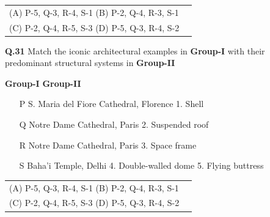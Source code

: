 \documentclass[journal,12pt,onecolumn]{IEEEtran}
\theoremstyle{remark}
\begin{document}
 \bigskip
 
\begin{tabular}{ll}
\hspace{2cm}(A)  P-5, Q-3, R-4, S-1
\hspace{4cm}(B)  P-2, Q-4, R-3, S-1 \\  \vspace{0.5cm}
\hspace{2cm}(C)  P-2, Q-4, R-5, S-3 
\hspace{4cm}(D)  P-5, Q-3, R-4, S-2 
\end{tabular}


\vspace{0.5cm}

\textbf{Q.31} Match the iconic architectural examples in \textbf{Group-I} with their predominant structural systems in \textbf{Group-II}

\vspace{0.15cm}

\hspace{3cm}  \textbf{Group-I}\hspace{8cm} \textbf{Group-II} \\
\vspace{0.15cm}


\begin{enumerate}
    \item[P] \hspace{0.45cm} S. Maria del Fiore Cathedral, Florence \hspace{5cm} 1. Shell
    \item[Q] \hspace{0.45cm} Notre Dame Cathedral, Paris \hspace{6.4cm} 2. Suspended roof
    \item[R] \hspace{0.45cm} Notre Dame Cathedral, Paris \hspace{6.4cm} 3. Space frame
    \item[S] \hspace{0.45cm}  Baha'i Temple, Delhi \hspace{7.6cm} 4. Double-walled dome \hspace{11cm} 5. Flying buttress
\end{enumerate}
 \bigskip
 
\begin{tabular}{ll}
\hspace{2cm}(A)  P-5, Q-3, R-4, S-1
\hspace{4cm}(B)  P-2, Q-4, R-3, S-1 \\  \vspace{0.5cm}
\hspace{2cm}(C)  P-2, Q-4, R-5, S-3 
\hspace{4cm}(D)  P-5, Q-3, R-4, S-2 
\end{tabular}
\end{document}
